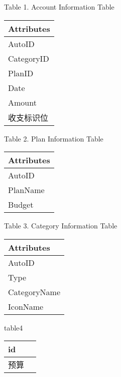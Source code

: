 \documentclass[
]{article}
\begin{document}
Table 1. Account Information Table

\begin{longtable}[]{@{}l@{}}
\toprule()
Attributes  \\
\midrule()
\endhead
AutoID  \\
CategoryID  \\
PlanID  \\
Date  \\
Amount  \\
收支标识位 \\
\bottomrule()
\end{longtable}

Table 2. Plan Information Table

\begin{longtable}[]{@{}l@{}}
\toprule()
Attributes  \\
\midrule()
\endhead
AutoID  \\
PlanName  \\
Budget  \\
\bottomrule()
\end{longtable}

Table 3. Category Information Table

\begin{longtable}[]{@{}l@{}}
\toprule()
Attributes  \\
\midrule()
\endhead
AutoID  \\
Type  \\
CategoryName  \\
IconName  \\
\bottomrule()
\end{longtable}

table4

\begin{longtable}[]{@{}ll@{}}
\toprule()
id & \\
\midrule()
\endhead
预算 & \\
\bottomrule()
\end{longtable}
\end{document}
